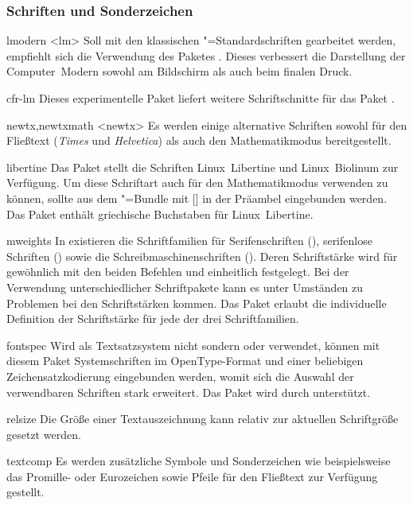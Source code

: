 \subsubsection{Schriften und Sonderzeichen}
\begin{packages}
\item[lmodern]<lm>
  Soll mit den klassischen "=Standardschriften gearbeitet werden, 
  empfiehlt sich die Verwendung des Paketes . Dieses 
  verbessert die Darstellung der Computer~Modern sowohl am Bildschirm als auch 
  beim finalen Druck.
\item[cfr-lm]
  Dieses experimentelle Paket liefert weitere Schriftschnitte für das Paket 
  .
\item[newtx,newtxmath]<newtx>
  Es werden einige alternative Schriften sowohl für den Fließtext 
  (\textit{Times} und \textit{Helvetica}) als auch den Mathematikmodus 
  bereitgestellt.
\item[libertine]
  Das Paket stellt die Schriften Linux~Libertine und Linux~Biolinum zur 
  Verfügung. Um diese Schriftart auch für den Mathematikmodus verwenden zu 
  können, sollte  aus dem "=Bundle mit 
  [] in der 
  Präambel eingebunden werden. Das Paket  enthält griechische 
  Buchstaben für Linux~Libertine.
\item[mweights]
  In  existieren die Schriftfamilien für Serifenschriften 
  (), serifenlose Schriften () sowie die 
  Schreibmaschinenschriften (). Deren Schriftstärke wird für 
  gewöhnlich mit den beiden Befehlen  und  
  einheitlich festgelegt. Bei der Verwendung unterschiedlicher Schriftpakete 
  kann es unter Umständen zu Problemen bei den Schriftstärken kommen. Das Paket 
   erlaubt die individuelle Definition der Schriftstärke für 
  jede der drei Schriftfamilien.
\item[fontspec]
  Wird als Textsatzsystem nicht  sondern    
  oder  verwendet, können mit diesem Paket Systemschriften im 
  OpenType-Format und einer beliebigen Zeichensatzkodierung eingebunden werden, 
  womit sich die Auswahl der verwendbaren Schriften stark erweitert. Das Paket 
  wird durch \TUDScript unterstützt.
\item[relsize]
  Die Größe einer Textauszeichnung kann relativ zur aktuellen Schriftgröße 
  gesetzt werden.
\item[textcomp]
  Es werden zusätzliche Symbole und Sonderzeichen wie beispielsweise das 
  Promille- oder Eurozeichen sowie Pfeile für den Fließtext zur Verfügung 
  gestellt.
\end{packages}
